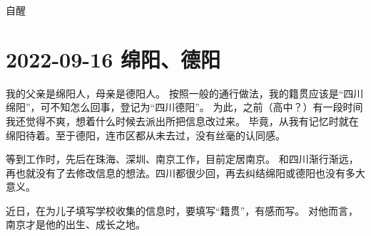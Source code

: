 \begin{taged}{自醒}
\section{2022-09-16 绵阳、德阳}
\end{taged}

我的父亲是绵阳人，母亲是德阳人。
按照一般的通行做法，我的籍贯应该是“四川绵阳”，可不知怎么回事，登记为“四川德阳”。
为此，之前（高中？）有一段时间我还觉得不爽，想着什么时候去派出所把信息改过来。
毕竟，从我有记忆时就在绵阳待着。至于德阳，连市区都从未去过，没有丝毫的认同感。

等到工作时，先后在珠海、深圳、南京工作，目前定居南京。
和四川渐行渐远，再也就没有了去修改信息的想法。四川都很少回，再去纠结绵阳或德阳也没有多大意义。


近日，在为儿子填写学校收集的信息时，要填写“籍贯”，有感而写。
对他而言，南京才是他的出生、成长之地。

